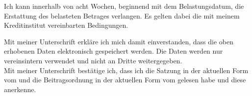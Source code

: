 \documentclass[paper=a4,twoside=false,DIV=15,fontsize=11pt,parskip=half]{scrartcl}
\begin{document}
\begin{Form}
Ich kann innerhalb von acht Wochen, beginnend mit dem Belastungsdatum, die Erstattung des belasteten Betrages verlangen.
Es gelten dabei die mit meinem Kreditinstitut vereinbarten Bedingungen.

Mit meiner Unterschrift erkläre ich mich damit einverstanden, dass die oben erhobenen Daten elektronisch gespeichert werden.
Die Daten werden nur vereinsintern verwendet und nicht an Dritte weitergegeben.\\[-\baselineskip]

Mit meiner Unterschrift bestätige ich, dass ich die Satzung in der aktuellen Form vom \datumsatzung und die Beitragsordnung in der aktuellen Form vom \datumbeitrago gelesen habe und diese anerkenne.\\

\vspace{0.5cm}

 \hfill {}\\[0.5mm]

\end{Form}
\end{document}

